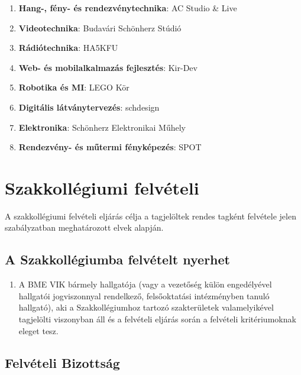 \documentclass[12pt]{report}
\begin{document}
\begin{enumerate}
  \item \textbf{Hang-, fény- és rendezvénytechnika}: AC Studio \& Live
  \item \textbf{Videotechnika}: Budavári Schönherz Stúdió
  \item \textbf{Rádiótechnika}: HA5KFU
  \item \textbf{Web- és mobilalkalmazás fejlesztés}: Kir-Dev
  \item \textbf{Robotika és MI}: LEGO Kör
  \item \textbf{Digitális látványtervezés}: schdesign
  \item \textbf{Elektronika}: Schönherz Elektronikai Műhely
  \item \textbf{Rendezvény- és műtermi fényképezés}: SPOT
\end{enumerate}


\chapter{Szakkollégiumi felvételi} \label{annex_admission}

A szakkollégiumi felvételi eljárás célja a tagjelöltek rendes tagként felvétele jelen szabályzatban meghatározott elvek alapján.

\section{A Szakkollégiumba felvételt nyerhet}

\begin{enumerate}
  \item A BME VIK bármely hallgatója (vagy a vezetőség külön engedélyével hallgatói jogviszonnyal rendelkező, felsőoktatási intézményben tanuló hallgató), 
    aki a Szakkollégiumhoz tartozó szakterületek valamelyikével tagjelölti viszonyban áll és a felvételi eljárás során a felvételi kritériumoknak eleget tesz.
\end{enumerate}

\section{Felvételi Bizottság}
\end{document}
